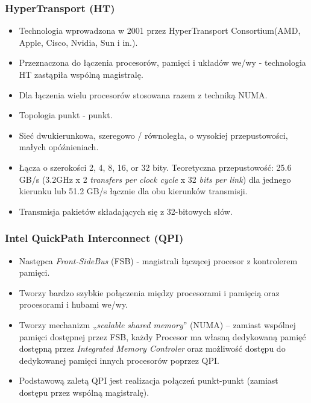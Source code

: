 \documentclass[a4paper,twoside]{article}
\begin{document}
\subsubsection{HyperTransport (HT)}
\begin{itemize}
	\item Technologia wprowadzona w 2001 przez HyperTransport Consortium(AMD, Apple, Cisco, Nvidia, Sun i in.).
	\item Przeznaczona do łączenia procesorów, pamięci i układów we/wy - technologia HT zastąpiła wspólną magistralę.
	\item Dla łączenia wielu procesorów stosowana razem z techniką NUMA.
	\item Topologia punkt - punkt.
	\item Sieć dwukierunkowa, szeregowo / równoległa, o wysokiej przepustowości, małych opóźnieniach.
	\item Łącza o szerokości 2, 4, 8, 16, or 32 bity. Teoretyczna przepustowość: 25.6 GB/s (3.2GHz x 2 \textit{transfers per clock cycle} x 32 \textit{bits per link}) dla jednego kierunku lub 51.2 GB/s łącznie dla obu kierunków transmisji.
	\item Transmisja pakietów składających się z 32-bitowych słów.
\end{itemize}
\subsubsection{Intel QuickPath Interconnect (QPI)}
\begin{itemize}
	\item Następca \emph{Front-SideBus} (FSB) - magistrali łączącej procesor z kontrolerem pamięci.
	\item Tworzy bardzo szybkie połączenia między procesorami i pamięcią oraz procesorami i hubami we/wy.
	\item Tworzy mechanizm „\emph{scalable shared memory}” (NUMA) – zamiast wspólnej pamięci dostępnej przez FSB, każdy Procesor ma własną dedykowaną pamięć dostępną przez \textit{Integrated Memory Controler} oraz możliwość dostępu do dedykowanej pamięci innych procesorów poprzez QPI.
	\item Podstawową zaletą QPI jest realizacja połączeń punkt-punkt (zamiast dostępu przez wspólną magistralę).
\end{itemize}
\end{document}
